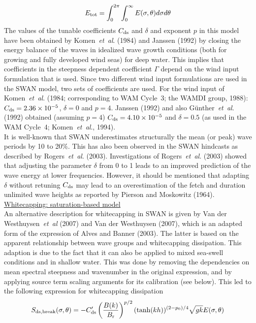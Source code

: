 \documentclass[12pt]{book}
\begin{document}
\begin{equation}
  E_{\rm tot} = \int_{0}^{2\pi} \int_{0}^{\infty} E(\sigma,\theta)d\sigma d\theta
  \label{eq3-16}
\end{equation}
The values of the tunable coefficients $C_{\rm ds}$ and $\delta$ and exponent $p$ in this model have been obtained by
Komen~{\it et~al}. (1984) and Janssen (1992) by closing the energy balance of the waves in idealized wave growth conditions
(both for growing and fully developed wind seas) for deep water. This implies that coefficients in the steepness dependent
coefficient $\Gamma$ depend on the wind input formulation that is used. Since two different wind input formulations are
used in the SWAN model, two sets of coefficients are used. For the wind input of Komen~{\it et~al}. (1984; corresponding to WAM
Cycle~3; the WAMDI group, 1988): $C_{\rm ds} = 2.36 \times 10^{-5}$, $\delta=0$ and $p=4$. Janssen (1992) and also
G\"{u}nther~{\it et~al}. (1992) obtained (assuming $p=4$) $C_{\rm ds} = 4.10 \times 10^{-5}$ and $\delta=0.5$ (as used in the WAM
Cycle~4; Komen~{\it et~al}., 1994).
\\[2ex]
It is well-known that SWAN underestimates structurally the mean (or peak) wave periods by 10 to 20\%.
This has also been observed in the SWAN hindcasts
as described by Rogers~{\it et~al}. (2003). Investigations of Rogers~{\it et~al}. (2003) showed that adjusting the parameter $\delta$
from 0 to 1 leads to an improved prediction of the wave energy at lower frequencies. However, it should be mentioned that adapting
$\delta$ without retuning
$C_{\rm ds}$ may lead to an overestimation of the fetch and duration unlimited wave heights as reported by
Pierson and Moskowitz (1964).
\\[2ex]
\noindent
\underline{Whitecapping: saturation-based model}\\[2ex]
An alternative description for whitecapping in SWAN is given by Van der Westhuysen~{\it et~al} (2007) and
Van der Westhuysen (2007), which is an adapted form of the expression of Alves and Banner (2003). The latter is based
on the apparent relationship between wave groups and whitecapping dissipation. This adaption is due to the fact that it
can also be applied to mixed sea-swell conditions and in shallow water. This was done by removing the dependencies on mean
spectral steepness and wavenumber in the original expression, and by applying source term scaling arguments for its
calibration (see below). This led to the following expression for whitecapping dissipation
\begin{equation}
  S_{\rm ds,break} (\sigma,\theta) = -C'_{\rm ds} \left( \frac{B(k)}{B_{\rm r}} \right)^{p/2} (\tanh(kh))^{(2-p_0)/4}
                                  \sqrt{gk} E(\sigma,\theta)
  \label{eq:satu}
\end{equation}
\end{document}
